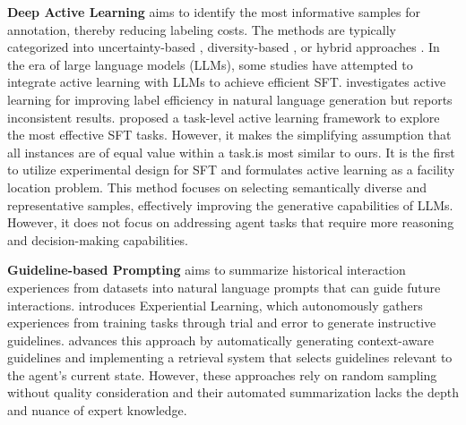 \textbf{Deep Active Learning} aims to identify the most informative samples for annotation, thereby reducing labeling costs. The methods are typically categorized into uncertainty-based \cite{Settles-Burr-JMLR-2011-ActiveLearning,Kremer-Jan-WIREs-DMKD-2014-ActiveSVM}, diversity-based \cite{Sener-Ozan-ICLR-2018-CoreSet,bukharin-etal-2024-data-Diversity,Bhatt-Gantavya-ACL-2024-ExperimentalDesign}, or hybrid approaches \cite{azeemi-etal-2025-label}. In the era of large language models (LLMs), some studies have attempted to integrate active learning with LLMs to achieve efficient SFT. \cite{azeemi-etal-2025-label} investigates active learning for improving label efficiency in natural language generation but reports inconsistent results. \cite{Kung-Po-Nien-EMNLP-2024-ActiveInstruction} proposed a task-level active learning framework to explore the most effective SFT tasks. However, it makes the simplifying assumption that all instances are of equal value within a task.\cite{Bhatt-Gantavya-ACL-2024-ExperimentalDesign}is most similar to ours. It is the first to utilize experimental design for SFT and formulates active learning as a facility location problem. This method focuses on selecting semantically diverse and representative samples, effectively improving the generative capabilities of LLMs. However, it does not focus on addressing agent tasks that require more reasoning and decision-making capabilities.




\textbf{Guideline-based Prompting} aims to summarize historical interaction experiences from datasets into natural language prompts that can guide future interactions. 
\cite{Zhao-Andrew-AAAI-2024-ExpeL} introduces Experiential Learning, which autonomously gathers experiences from training tasks through trial and error to generate instructive guidelines. 
\cite{Fu-Yao-NeurIPS-2024-AutoGuide} advances this approach by automatically generating context-aware guidelines and implementing a retrieval system that selects guidelines relevant to the agent's current state.
However, these approaches rely on random sampling without quality consideration and their automated summarization lacks the depth and nuance of expert knowledge.
